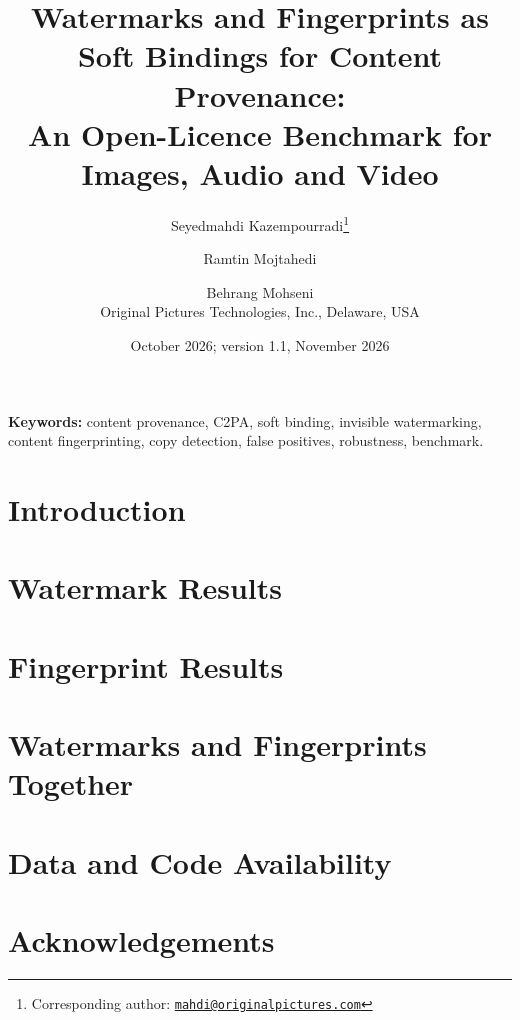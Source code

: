 \documentclass[11pt,letterpaper]{article}
\title{\Large\textbf{Watermarks and Fingerprints as Soft Bindings for Content Provenance:}\\[2pt] \large\textbf{An Open-Licence Benchmark for Images, Audio and Video}}
\author{Seyedmahdi Kazempourradi\thanks{Corresponding author: \href{mailto:mahdi@originalpictures.com}{\texttt{mahdi@originalpictures.com}}} \and Ramtin Mojtahedi \and Behrang Mohseni\\[4pt]
\normalsize Original Pictures Technologies, Inc., Delaware, USA}
\date{October 2026; version 1.1, November 2026}
\begin{document}
\maketitle

\begin{abstract}

\end{abstract}

\noindent\textbf{Keywords:} content provenance, C2PA, soft binding, invisible watermarking, content fingerprinting, copy detection, false positives, robustness, benchmark.

\section{Introduction}
\label{sec:introduction}






\section{Watermark Results}
\label{sec:wm-results}



\section{Fingerprint Results}
\label{sec:fp-results}



\section{Watermarks and Fingerprints Together}
\label{sec:together}









\section*{Data and Code Availability}


\section*{Acknowledgements}

\end{document}
